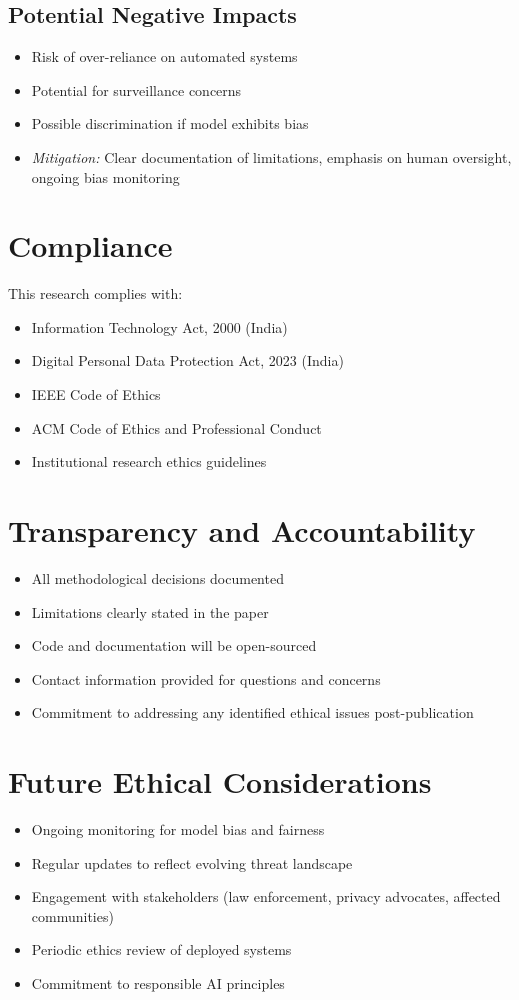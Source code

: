 \documentclass[10pt,a4paper]{article}
\begin{document}
\subsection{Potential Negative Impacts}
\begin{itemize}[leftmargin=*]
\item Risk of over-reliance on automated systems
\item Potential for surveillance concerns
\item Possible discrimination if model exhibits bias
\item \textit{Mitigation:} Clear documentation of limitations, emphasis on human oversight, ongoing bias monitoring
\end{itemize}

\section{Compliance}

This research complies with:
\begin{itemize}[leftmargin=*]
\item Information Technology Act, 2000 (India)
\item Digital Personal Data Protection Act, 2023 (India)
\item IEEE Code of Ethics
\item ACM Code of Ethics and Professional Conduct
\item Institutional research ethics guidelines
\end{itemize}

\section{Transparency and Accountability}

\begin{itemize}[leftmargin=*]
\item All methodological decisions documented
\item Limitations clearly stated in the paper
\item Code and documentation will be open-sourced
\item Contact information provided for questions and concerns
\item Commitment to addressing any identified ethical issues post-publication
\end{itemize}

\section{Future Ethical Considerations}

\begin{itemize}[leftmargin=*]
\item Ongoing monitoring for model bias and fairness
\item Regular updates to reflect evolving threat landscape
\item Engagement with stakeholders (law enforcement, privacy advocates, affected communities)
\item Periodic ethics review of deployed systems
\item Commitment to responsible AI principles
\end{itemize}
\end{document}
